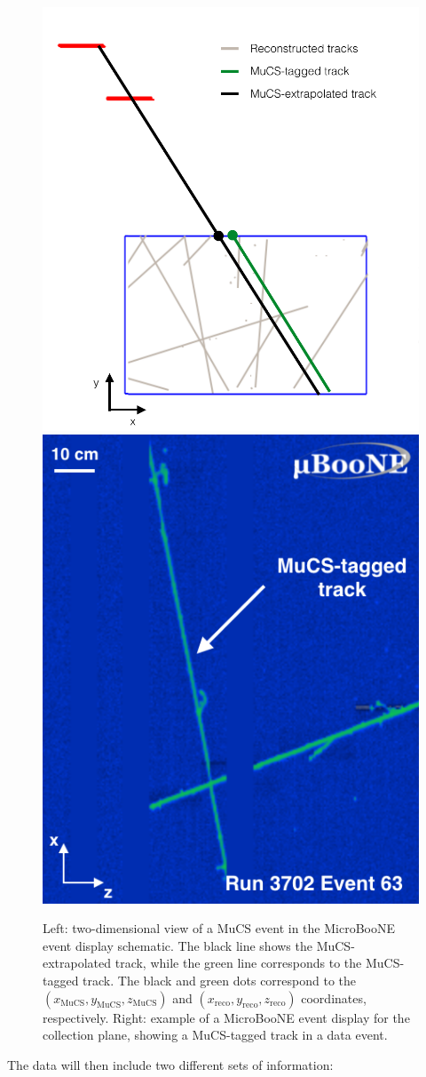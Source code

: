\documentclass[a4paper,11pt]{article}
\begin{document}
\begin{figure}[htbp]
  \begin{center}
  \includegraphics[width=0.50\linewidth]{figures/evd.pdf}
  \includegraphics[width=0.40\linewidth]{figures/evd_display.png}

  \caption{Left: two-dimensional view of a MuCS event in the MicroBooNE event display schematic. The black line shows the MuCS-extrapolated track, while the green line corresponds to the MuCS-tagged track. The black and green dots correspond to the $(x_{\mathrm{MuCS}},y_{\mathrm{MuCS}},z_{\mathrm{MuCS}})$ and $(x_{\mathrm{reco}},y_{\mathrm{reco}},z_{\mathrm{reco}})$ coordinates, respectively. Right: example of a MicroBooNE event display for the collection plane, showing a MuCS-tagged track in a data event.} \label{fig:evd}
\end{center}
\end{figure}
The data will then include two different sets of information:
\end{document}
